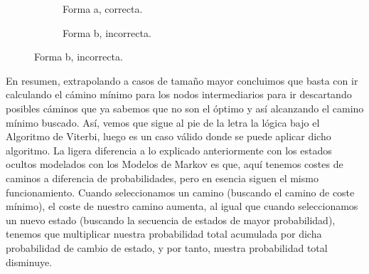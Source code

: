 \documentclass{article}
\begin{document}
\begin{figure}[!hbt]
    \centering
    \begin{subfigure}[b]{0.45\textwidth}
    \centering
    \caption{Forma a, correcta.}
    \end{subfigure}
    \begin{subfigure}[b]{0.45\textwidth}
    \centering
    \caption{Forma b, incorrecta.}
    \end{subfigure}
\end{figure}

En resumen, extrapolando a casos de tamaño mayor concluimos que basta con ir calculando el cámino mínimo para los nodos 
intermediarios para ir descartando posibles cáminos que ya sabemos que no son el óptimo 
y así alcanzando el camino mínimo buscado. Así, vemos que sigue al pie de la letra la lógica bajo el Algoritmo de Viterbi, luego
es un caso válido donde se puede aplicar dicho algoritmo.
La ligera diferencia a lo explicado anteriormente con los estados ocultos modelados con los Modelos de Markov es que,
aquí tenemos costes de caminos a diferencia de probabilidades, pero 
en esencia siguen el mismo funcionamiento. Cuando seleccionamos un camino (buscando el camino de coste mínimo),
el coste de nuestro camino aumenta, al igual que cuando seleccionamos un nuevo estado (buscando la secuencia de estados
de mayor probabilidad), tenemos que multiplicar
nuestra probabilidad total acumulada por dicha probabilidad de cambio 
de estado, y por tanto, nuestra probabilidad
total disminuye. 
\end{document}
